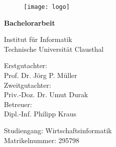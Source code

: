 \begin{titlingpage}

\begingroup
\begin{figure}[h!]
    \centering
	\texttt{[image: logo]}
\end{figure}
\let\newpage\relax%
\center\huge{\textbf{Bachelorarbeit}}
\maketitle
\endgroup


\begin{center}

\vspace{2em}


Institut für Informatik \\
\vspace{0.5em}
Technische Universität Clausthal \\


\vspace{5em}


Erstgutachter: \\
\vspace{0.5em}
Prof. Dr. Jörg P. Müller \\
\vspace{1em}
Zweitgutachter: \\
\vspace{0.5em}
Priv.-Doz. Dr. Umut Durak \\
\vspace{1em}
Betreuer: \\
\vspace{0.5em}
Dipl.-Inf. Philipp Kraus


\vspace{5em}


Studiengang: Wirtschaftsinformatik \\
\vspace{0.5em}
Matrikelnummer: 295798\\


\end{center}


\end{titlingpage}

\tableofcontents
\listoffigures